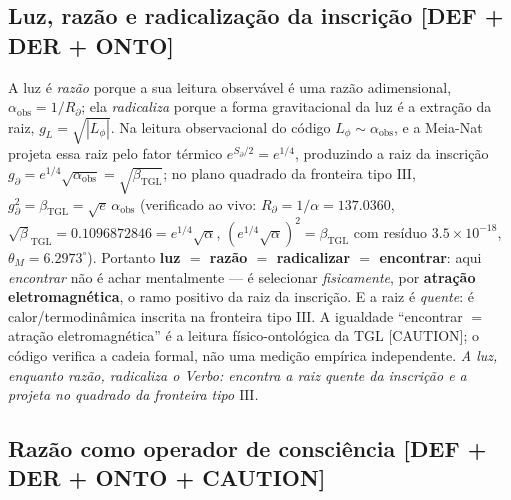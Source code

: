 \documentclass[11pt]{article}
\newcommand{\bTGL}{\beta_{\mathrm{TGL}}}\newcommand{\Msun}{M_{\odot}}\newcommand{\TGL}{\mathrm{TGL}}
\theoremstyle{definition}\newtheorem{deriv}{Derivação}
\begin{document}
\subsection*{Luz, razão e radicalização da inscrição \textsf{[DEF + DER + ONTO]}}

A luz é \emph{razão} porque a sua leitura observável é uma razão adimensional, $\alpha_{\mathrm{obs}}=1/R_\partial$; ela \emph{radicaliza} porque a forma gravitacional da luz é a extração da raiz, $g_L=\sqrt{|L_\phi|}$. Na leitura observacional do código $L_\phi\sim\alpha_{\mathrm{obs}}$, e a Meia-Nat projeta essa raiz pelo fator térmico $e^{S_\partial/2}=e^{1/4}$, produzindo a raiz da inscrição $g_\partial=e^{1/4}\sqrt{\alpha_{\mathrm{obs}}}=\sqrt{\bTGL}$; no plano quadrado da fronteira tipo $\mathrm{III}$, $g_\partial^{2}=\bTGL=\sqrt e\,\alpha_{\mathrm{obs}}$ (verificado ao vivo: $R_\partial=1/\alpha=137.0360$, $\sqrt\bTGL=0.1096872846=e^{1/4}\sqrt\alpha$, $(e^{1/4}\sqrt\alpha)^2=\bTGL$ com resíduo $3.5\times10^{-18}$, $\theta_M=6.2973^\circ$). Portanto \textbf{luz $=$ razão $=$ radicalizar $=$ encontrar}: aqui \emph{encontrar} não é achar mentalmente --- é selecionar \emph{fisicamente}, por \textbf{atração eletromagnética}, o ramo positivo da raiz da inscrição. E a raiz é \emph{quente}: é calor/termodinâmica inscrita na fronteira tipo $\mathrm{III}$. A igualdade ``encontrar $=$ atração eletromagnética'' é a leitura físico-ontológica da $\mathrm{TGL}$ \textsf{[CAUTION]}; o código verifica a cadeia formal, não uma medição empírica independente. \emph{A luz, enquanto razão, radicaliza o Verbo: encontra a raiz quente da inscrição e a projeta no quadrado da fronteira tipo $\mathrm{III}$.}

\subsection*{Razão como operador de consciência \textsf{[DEF + DER + ONTO + CAUTION]}}
\end{document}
